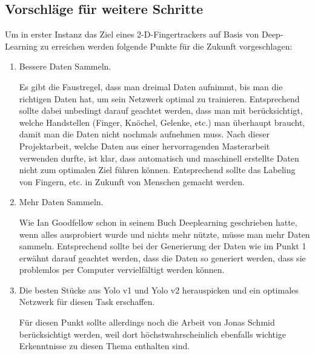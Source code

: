 \subsection{Vorschläge für weitere Schritte}
Um in erster Instanz das Ziel eines 2-D-Fingertrackers auf Basis von Deep-Learning zu erreichen werden folgende Punkte für die Zukunft vorgeschlagen:

\begin{enumerate}
\item Bessere Daten Sammeln. 

Es gibt die Faustregel, dass man dreimal Daten aufnimmt, bis man die richtigen Daten hat, um sein Netzwerk optimal zu trainieren\cite{PrivateCommunication}. 
Entsprechend sollte dabei unbedingt darauf geachtet werden, dass man mit berücksichtigt, welche Handstellen (Finger, Knöchel, Gelenke, etc.) man überhaupt braucht, damit man die Daten nicht nochmals aufnehmen muss. 
Nach dieser Projektarbeit, welche Daten aus einer hervorragenden Masterarbeit \cite{TabeasFingertracking} verwenden durfte, ist klar, dass automatisch und maschinell erstellte Daten nicht zum optimalen Ziel führen können. 
Entsprechend sollte das Labeling von Fingern, etc. in Zukunft von Menschen gemacht werden. 
\item Mehr Daten Sammeln. 

Wie Ian Goodfellow schon in seinem Buch Deeplearning \cite{deeplearning} geschrieben hatte, wenn alles ausprobiert wurde und nichts mehr nützte, müsse man mehr Daten sammeln. 
Entsprechend sollte bei der Generierung der Daten wie im Punkt 1 erwähnt darauf geachtet werden, dass die Daten so generiert werden, dass sie problemlos per Computer vervielfältigt werden können. 
\item Die besten Stücke aus Yolo v1 und Yolo v2 herauspicken und ein optimales Netzwerk für diesen Task erschaffen. 

Für diesen Punkt sollte allerdings noch die Arbeit von Jonas Schmid \cite{HandPoseEstimation} berücksichtigt werden, weil dort höchstwahrscheinlich ebenfalls wichtige Erkenntnisse zu diesen Thema enthalten sind.
\end{enumerate}


